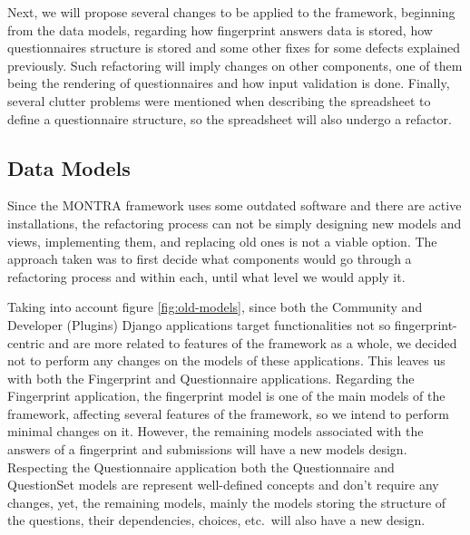Next, we will propose several changes to be applied to the framework, beginning from the data models, regarding how fingerprint answers data is stored, how questionnaires structure is stored and some other fixes for some defects explained previously.
Such refactoring will imply changes on other components, one of them being the rendering of questionnaires and how input validation is done.
Finally, several clutter problems were mentioned when describing the spreadsheet to define a questionnaire structure, so the spreadsheet will also undergo a refactor.

\subsection{Data Models}


Since the MONTRA framework uses some outdated software and there are active installations, the refactoring process can not be simply designing new models and views, implementing them, and replacing old ones is not a viable option.
The approach taken was to first decide what components would go through a refactoring process and within each, until what level we would apply it.

Taking into account figure \ref{fig:old-models}, since both the Community and Developer (Plugins) Django applications target functionalities not so fingerprint-centric and are more related to features of the framework as a whole, we decided not to perform any changes on the models of these applications.
This leaves us with both the Fingerprint and Questionnaire applications.
Regarding the Fingerprint application, the fingerprint model is one of the main models of the framework, affecting several features of the framework, so we intend to perform minimal changes on it.
However, the remaining models associated with the answers of a fingerprint and submissions will have a new models design.
Respecting the Questionnaire application both the Questionnaire and QuestionSet models are represent well-defined concepts and don't require any changes, yet, the remaining models, mainly the models storing the structure of the questions, their dependencies, choices, etc.\, will also have a new design.

